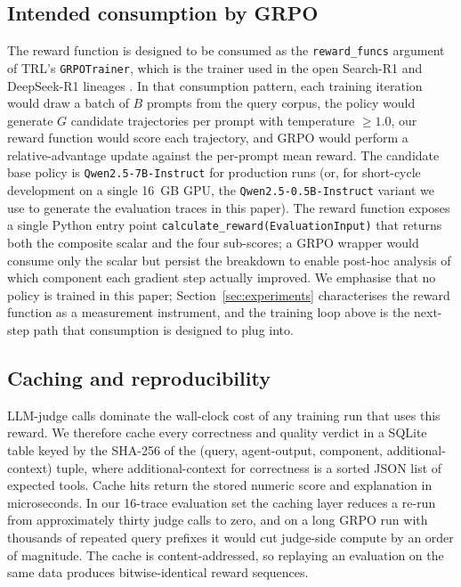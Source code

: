 \documentclass[10pt,twocolumn]{article}
\begin{document}
\subsection{Intended consumption by GRPO}
\label{sec:method:training}
The reward function is designed to be consumed as the \texttt{reward\_funcs} argument of TRL's \texttt{GRPOTrainer}, which is the trainer used in the open Search-R1 and DeepSeek-R1 lineages \cite{shao2024deepseekmath, jin2025searchr1, deepseek2025r1}. In that consumption pattern, each training iteration would draw a batch of $B$ prompts from the query corpus, the policy would generate $G$ candidate trajectories per prompt with temperature $\geq 1.0$, our reward function would score each trajectory, and GRPO would perform a relative-advantage update against the per-prompt mean reward. The candidate base policy is \texttt{Qwen2.5-7B-Instruct} for production runs (or, for short-cycle development on a single 16~GB GPU, the \texttt{Qwen2.5-0.5B-Instruct} variant we use to generate the evaluation traces in this paper). The reward function exposes a single Python entry point \texttt{calculate\_reward(EvaluationInput)} that returns both the composite scalar and the four sub-scores; a GRPO wrapper would consume only the scalar but persist the breakdown to enable post-hoc analysis of which component each gradient step actually improved. We emphasise that no policy is trained in this paper; Section~\ref{sec:experiments} characterises the reward function as a measurement instrument, and the training loop above is the next-step path that consumption is designed to plug into.

\subsection{Caching and reproducibility}
\label{sec:method:caching}
LLM-judge calls dominate the wall-clock cost of any training run that uses this reward. We therefore cache every correctness and quality verdict in a SQLite table keyed by the SHA-256 of the (query, agent-output, component, additional-context) tuple, where additional-context for correctness is a sorted JSON list of expected tools. Cache hits return the stored numeric score and explanation in microseconds. In our 16-trace evaluation set the caching layer reduces a re-run from approximately thirty judge calls to zero, and on a long GRPO run with thousands of repeated query prefixes it would cut judge-side compute by an order of magnitude. The cache is content-addressed, so replaying an evaluation on the same data produces bitwise-identical reward sequences.
\end{document}
